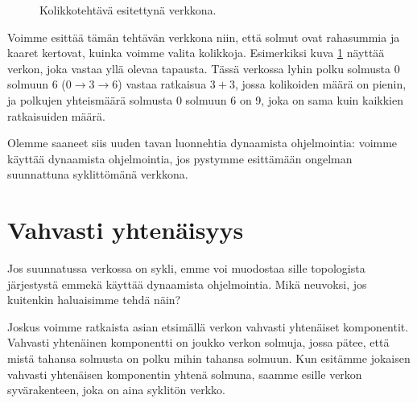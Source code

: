 \begin{figure}
\center
\begin{center}
\end{center}
\caption{Kolikkotehtävä esitettynä verkkona.}
\label{fig:verkol}
\end{figure}

Voimme esittää tämän tehtävän verkkona niin,
että solmut ovat rahasummia ja kaaret kertovat,
kuinka voimme valita kolikkoja.
Esimerkiksi kuva \ref{fig:verkol} näyttää verkon,
joka vastaa yllä olevaa tapausta.
Tässä verkossa lyhin polku solmusta 0 solmuun 6
($0 \rightarrow 3 \rightarrow 6$)
vastaa ratkaisua $3+3$, jossa kolikoiden määrä on pienin,
ja polkujen yhteismäärä solmusta 0 solmuun 6 on 9,
joka on sama kuin kaikkien ratkaisuiden määrä.

Olemme saaneet siis uuden tavan luonnehtia dynaamista ohjelmointia:
voimme käyttää dynaamista ohjelmointia,
jos pystymme esittämään ongelman suunnattuna syklittömänä verkkona.

\section{Vahvasti yhtenäisyys}

Jos suunnatussa verkossa on sykli,
emme voi muodostaa sille topologista järjestystä
emmekä käyttää dynaamista ohjelmointia.
Mikä neuvoksi, jos kuitenkin haluaisimme tehdä näin?

Joskus voimme ratkaista asian etsimällä
verkon vahvasti yhtenäiset komponentit.
Vahvasti yhtenäinen komponentti on joukko verkon solmuja,
jossa pätee, että mistä tahansa solmusta on polku
mihin tahansa solmuun.
Kun esitämme jokaisen vahvasti yhtenäisen komponentin
yhtenä solmuna, saamme esille verkon syvärakenteen,
joka on aina syklitön verkko.

